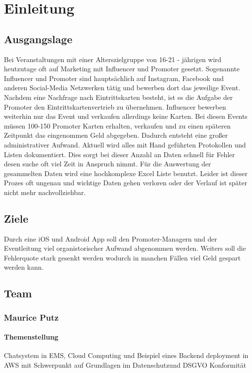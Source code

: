 \chapter{Einleitung}


\section{Ausgangslage}
Bei Veranstaltungen mit einer Alterszielgruppe von 16-21 - jährigen wird heutzutage oft auf Marketing mit Influencer und Promoter gesetzt. 
Sogenannte Influencer und Promoter sind hauptsächlich auf Instagram, Facebook und anderen Social-Media Netzwerken tätig und bewerben dort das jeweilige Event. 
Nachdem eine Nachfrage nach Eintrittskarten besteht, ist es die Aufgabe der Promoter den Eintrittskartenvertrieb zu übernehmen. 
Influencer bewerben weiterhin nur das Event und verkaufen allerdings keine Karten. 
Bei diesen Events müssen 100-150 Promoter Karten erhalten, verkaufen und zu einen späteren Zeitpunkt das eingenommen Geld abgegeben. Dadurch entsteht eine großer 
administrativer Aufwand. Aktuell wird alles mit Hand geführten Protokollen und Listen dokumentiert. Dies sorgt bei dieser Anzahl an Daten schnell für Fehler desen suche
oft viel Zeit in Anspruch nimmt. Für die Auswertung der gesammelten Daten wird eine hochkomplexe Excel Liste benutzt. Leider ist dieser Prozes oft ungenau und wichtige 
Daten gehen verloren oder der Verlauf ist später nicht mehr nachvollziehbar. 

\section{Ziele}
Durch eine iOS und Android App soll den Promoter-Managern und der Eventleitung viel organistorischer Aufwand abgenommen werden. Weiters soll die Fehlerquote stark gesenkt werden
wodurch in manchen Fällen viel Geld gespart werden kann. 

\newpage
\section{Team}

\subsection{Maurice Putz}
\subsubsection{Themenstellung}
Chatsystem in EMS, Cloud Computing und Beispiel eines Backend deployment in AWS mit Schwerpunkt auf Grundlagen im Datenschutzund DSGVO Konformität
